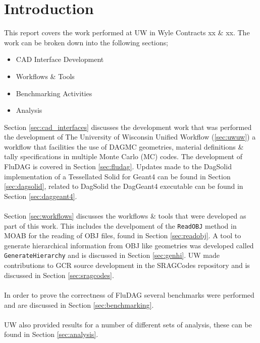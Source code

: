 
\section{Introduction}
This report covers the work performed at UW in Wyle Contracts xx \& xx. The work
can be broken down into the following sections;

\begin{itemize}
  \item{CAD Interface Development}
  \item{Workflows \& Tools}
  \item{Benchmarking Activities}
  \item{Analysis}
\end{itemize}

Section \ref{sec:cad_interfaces} discusses the development work that was
performed the development of The University of Wisconsin Unified Workflow
(\ref{sec:uwuw}) a workflow that facilities the use of DAGMC geometries,
material definitions \& tally specifications in multiple Monte Carlo (MC) codes.
The development of FluDAG is covered in Section \ref{sec:fludag}. Updates made
to the DagSolid implementation of a Tessellated Solid for Geant4 can be found
in Section \ref{sec:dagsolid}, related to DagSolid the DagGeant4 executable
can be found in Section \ref{sec:daggeant4}.
\\
\\
Section \ref{sec:workflows} discusses the workflows \& tools that were developed
as part of this work. This includes the develpoment of the \texttt{ReadOBJ}
method in MOAB for the reading of OBJ files, found in Section \ref{sec:readobj}.
A tool to generate hierarchical information from OBJ like geometries was
developed called \texttt{GenerateHierarchy} and is discussed in Section
\ref{sec:genhi}. UW made contributions to GCR source development in the
SRAGCodes repository and is discussed in Section \ref{sec:sragcodes}.
\\
\\
In order to prove the correctness of FluDAG several benchmarks were performed
and are discussed in Section \ref{sec:benchmarking}.
\\
\\
UW also provided results for a number of different sets of analysis, these can
be found in Section \ref{sec:analysis}.

